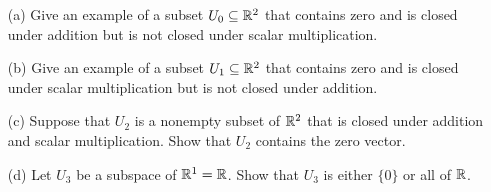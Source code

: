 \documentclass[a4paper]{amsart}
\begin{document}
\begin{exercise}\label{ex-subspace-iii}
 \begin{itemize}
  \item[(a)] Give an example of a subset $U_0\subseteq{\mathbb{R}}^2$ that contains
   zero and is closed under addition but is not closed under scalar
   multiplication.
  \item[(b)] Give an example of a subset $U_1\subseteq{\mathbb{R}}^2$ that contains
   zero and is closed under scalar multiplication but is not closed
   under addition.
  \item[(c)] Suppose that $U_2$ is a nonempty subset of ${\mathbb{R}}^2$ that is
   closed under addition and scalar multiplication.  Show that $U_2$
   contains the zero vector.
  \item[(d)] Let $U_3$ be a subspace of ${\mathbb{R}}^1={\mathbb{R}}$.  Show that $U_3$ is
   either $\{0\}$ or all of ${\mathbb{R}}$.
 \end{itemize}
\end{exercise}
\end{document}
